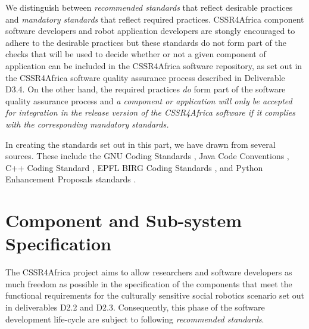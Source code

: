 \documentclass{CSSRforAfrica}
\begin{document}
We distinguish between {\em recommended standards} that reflect desirable practices and {\em mandatory standards} that reflect required practices.  CSSR4Africa component software developers and robot application developers are stongly encouraged to adhere to the desirable practices but these standards do not form part of the checks that will be used to decide whether or not a given component of application can be included in the  CSSR4Africa software repository, as set out in the CSSR4Africa software quality assurance process described in Deliverable D3.4.  On the other hand, the required practices {\em do} form part of the software quality assurance process and {\em a component or application will only be accepted for integration in the release version of the  CSSR4Africa software if it complies with the corresponding mandatory standards.}

In creating the standards set out in this part, we have drawn from several sources.  These include the GNU Coding Standards \cite{Stallman05},
Java Code Conventions \cite{java},
C++ Coding Standard \cite{cpp}, 
EPFL BIRG Coding Standards \cite{epfl}, and Python Enhancement Proposals standards \cite{pep8}.
 

\section{Component and Sub-system Specification}
\label{section:component_specification}

The  CSSR4Africa project aims to allow researchers and software developers as much freedom as possible in the specification of the components that meet the functional requirements for the culturally sensitive social robotics scenario set out in deliverables D2.2 and D2.3.  Consequently, this phase of the software development life-cycle are subject to following {\em recommended standards}. 
\end{document}

